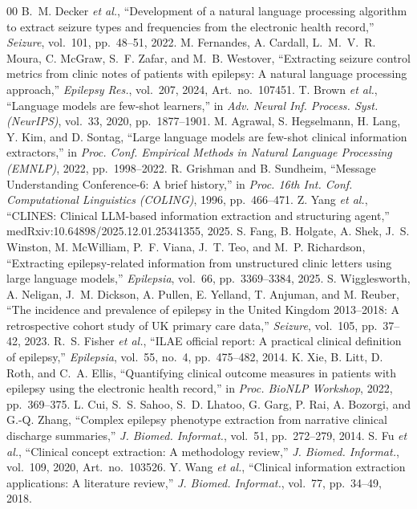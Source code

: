 \documentclass[conference]{IEEEtran}
\begin{document}
\begin{thebibliography}{00}
 B.~M. Decker \emph{et al.}, ``Development of a natural language processing algorithm to extract seizure types and frequencies from the electronic health record,'' \emph{Seizure}, vol.~101, pp.~48--51, 2022.
 M. Fernandes, A. Cardall, L.~M.~V.~R. Moura, C. McGraw, S.~F. Zafar, and M.~B. Westover, ``Extracting seizure control metrics from clinic notes of patients with epilepsy: A natural language processing approach,'' \emph{Epilepsy Res.}, vol.~207, 2024, Art.~no.~107451.
 T. Brown \emph{et al.}, ``Language models are few-shot learners,'' in \emph{Adv. Neural Inf. Process. Syst. (NeurIPS)}, vol.~33, 2020, pp.~1877--1901.
 M. Agrawal, S. Hegselmann, H. Lang, Y. Kim, and D. Sontag, ``Large language models are few-shot clinical information extractors,'' in \emph{Proc. Conf. Empirical Methods in Natural Language Processing (EMNLP)}, 2022, pp.~1998--2022.
 R. Grishman and B. Sundheim, ``Message Understanding Conference-6: A brief history,'' in \emph{Proc. 16th Int. Conf. Computational Linguistics (COLING)}, 1996, pp.~466--471.
 Z. Yang \emph{et al.}, ``CLINES: Clinical LLM-based information extraction and structuring agent,'' medRxiv:10.64898/2025.12.01.25341355, 2025.
 S. Fang, B. Holgate, A. Shek, J.~S. Winston, M. McWilliam, P.~F. Viana, J.~T. Teo, and M.~P. Richardson, ``Extracting epilepsy-related information from unstructured clinic letters using large language models,'' \emph{Epilepsia}, vol.~66, pp.~3369--3384, 2025.
 S. Wigglesworth, A. Neligan, J.~M. Dickson, A. Pullen, E. Yelland, T. Anjuman, and M. Reuber, ``The incidence and prevalence of epilepsy in the United Kingdom 2013--2018: A retrospective cohort study of UK primary care data,'' \emph{Seizure}, vol.~105, pp.~37--42, 2023.
 R.~S. Fisher \emph{et al.}, ``ILAE official report: A practical clinical definition of epilepsy,'' \emph{Epilepsia}, vol.~55, no.~4, pp.~475--482, 2014.
 K. Xie, B. Litt, D. Roth, and C.~A. Ellis, ``Quantifying clinical outcome measures in patients with epilepsy using the electronic health record,'' in \emph{Proc. BioNLP Workshop}, 2022, pp.~369--375.
 L. Cui, S.~S. Sahoo, S.~D. Lhatoo, G. Garg, P. Rai, A. Bozorgi, and G.-Q. Zhang, ``Complex epilepsy phenotype extraction from narrative clinical discharge summaries,'' \emph{J. Biomed. Informat.}, vol.~51, pp.~272--279, 2014.
 S. Fu \emph{et al.}, ``Clinical concept extraction: A methodology review,'' \emph{J. Biomed. Informat.}, vol.~109, 2020, Art.~no.~103526.
 Y. Wang \emph{et al.}, ``Clinical information extraction applications: A literature review,'' \emph{J. Biomed. Informat.}, vol.~77, pp.~34--49, 2018.

\end{thebibliography}
\end{document}
